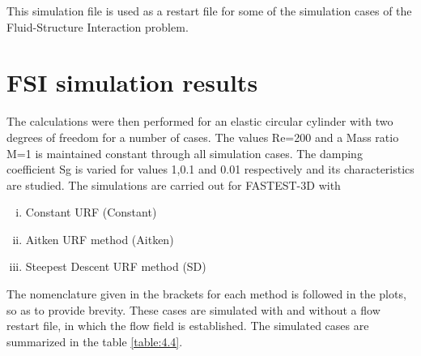 This simulation file is used as a restart file for some of the simulation cases of the Fluid-Structure Interaction problem.

\section{FSI simulation results}
The calculations were then performed for an elastic circular cylinder with two degrees of freedom for a number of cases. The values Re=200 and a Mass ratio M=1 is maintained constant through all simulation cases. The damping coefficient Sg is varied for values 1,0.1 and 0.01 respectively and its characteristics are studied. The simulations are carried out for FASTEST-3D with

\begin{enumerate}[(i)]
\item Constant URF (Constant)
\item Aitken URF method (Aitken)
\item Steepest Descent URF method (SD)
\end{enumerate}

The nomenclature given in the brackets for each method is followed in the plots, so as to provide brevity. These cases are simulated with and without a flow restart file, in which the flow field is established. The simulated cases are summarized in the table \ref{table:4.4}.

\begin{table}[htbp]
  \centering
  \setlength\aboverulesep{0pt}
  \setlength\belowrulesep{0pt} %
 \setcellgapes{3pt}\makegapedcells
  \caption{Summary of the various cases simulated}
  \label{table:4.4}%
\end{table}%

